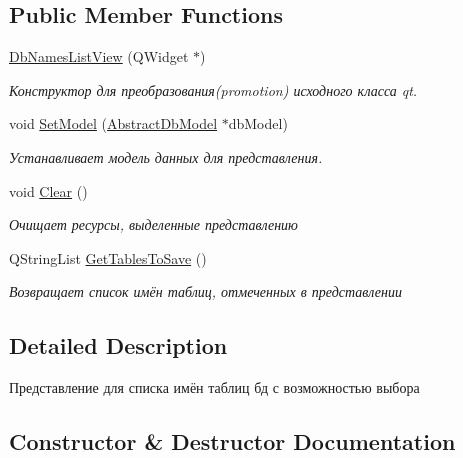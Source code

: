 \subsection*{Public Member Functions}
\begin{DoxyCompactItemize}
\item 
\hyperlink{class_db_names_list_view_acd95e819ffa36f121ade61a0a776521d}{Db\+Names\+List\+View} (Q\+Widget $\ast$)
\begin{DoxyCompactList}\small\item\em Конструктор для преобразования(promotion) исходного класса qt. \end{DoxyCompactList}\item 
void \hyperlink{class_db_names_list_view_a90d72f6024dd2b54f7dfa8c02edfd658}{Set\+Model} (\hyperlink{class_abstract_db_model}{Abstract\+Db\+Model} $\ast$db\+Model)
\begin{DoxyCompactList}\small\item\em Устанавливает модель данных для представления. \end{DoxyCompactList}\item 
\mbox{\label{class_db_names_list_view_a47edbf1349f633347f016d7496a55dab}} 
void \hyperlink{class_db_names_list_view_a47edbf1349f633347f016d7496a55dab}{Clear} ()
\begin{DoxyCompactList}\small\item\em Очищает ресурсы, выделенные представлению \end{DoxyCompactList}\item 
\mbox{\label{class_db_names_list_view_a00d3e4b0099bb79436824ef3ef840048}} 
Q\+String\+List \hyperlink{class_db_names_list_view_a00d3e4b0099bb79436824ef3ef840048}{Get\+Tables\+To\+Save} ()
\begin{DoxyCompactList}\small\item\em Возвращает список имён таблиц, отмеченных в представлении \end{DoxyCompactList}\end{DoxyCompactItemize}


\subsection{Detailed Description}
Представление для списка имён таблиц бд с возможностью выбора 

\subsection{Constructor \& Destructor Documentation}
\mbox{\label{class_db_names_list_view_acd95e819ffa36f121ade61a0a776521d}} 
